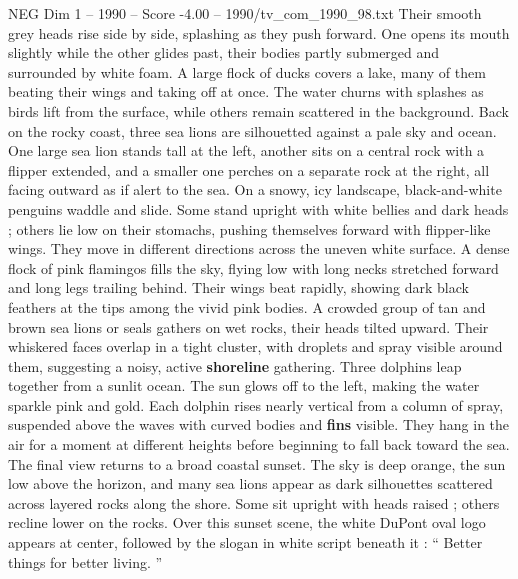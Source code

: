 \begin{textsample}{NEG Dim 1 – 1990 – Score -4.00 – 1990/tv\_com\_1990\_98.txt}
Their smooth grey heads rise side by side, splashing as they push forward.
One opens its mouth slightly while the other glides past, their bodies partly submerged and surrounded by white foam.
A large flock of ducks covers a lake, many of them beating their wings and taking off at once.
The water churns with splashes as birds lift from the surface, while others remain scattered in the background.
Back on the rocky coast, three sea lions are silhouetted against a pale sky and ocean.
One large sea lion stands tall at the left, another sits on a central rock with a flipper extended, and a smaller one perches on a separate rock at the right, all facing outward as if alert to the sea.
On a snowy, icy landscape, black-and-white penguins waddle and slide.
Some stand upright with white bellies and dark heads ; others lie low on their stomachs, pushing themselves forward with flipper-like wings.
They move in different directions across the uneven white surface.
A dense flock of pink flamingos fills the sky, flying low with long necks stretched forward and long legs trailing behind.
Their wings beat rapidly, showing dark black feathers at the tips among the vivid pink bodies.
A crowded group of tan and brown sea lions or seals gathers on wet rocks, their heads tilted upward.
Their whiskered faces overlap in a tight cluster, with droplets and spray visible around them, suggesting a noisy, active \textbf{shoreline} gathering.
Three dolphins leap together from a sunlit ocean.
The sun glows off to the left, making the water sparkle pink and gold.
Each dolphin rises nearly vertical from a column of spray, suspended above the waves with curved bodies and \textbf{fins} visible.
They hang in the air for a moment at different heights before beginning to fall back toward the sea.
The final view returns to a broad coastal sunset.
The sky is deep orange, the sun low above the horizon, and many sea lions appear as dark silhouettes scattered across layered rocks along the shore.
Some sit upright with heads raised ; others recline lower on the rocks.
Over this sunset scene, the white DuPont oval logo appears at center, followed by the slogan in white script beneath it : “ Better things for better living. ”

\end{textsample}
